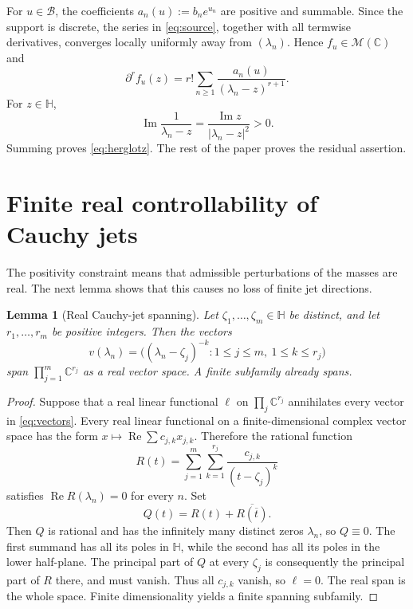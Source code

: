 \documentclass[11pt]{article}
\newtheorem{lemma}[theorem]{Lemma}
\newcommand{\C}{\mathbb C}
\newcommand{\HH}{\mathbb H}
\newcommand{\cB}{\mathcal B}
\newcommand{\cM}{\mathcal M}
\newcommand{\im}{\operatorname{Im}}
\newcommand{\D}{\partial}
\begin{document}
For $u\in\cB$, the coefficients $a_n(u):=b_ne^{u_n}$ are positive and summable.  Since the
support is discrete, the series in \eqref{eq:source}, together with all termwise derivatives,
converges locally uniformly away from $(\lambda_n)$.  Hence $f_u\in\cM(\C)$ and
\begin{equation}\label{eq:jets}
  \D^rf_u(z)=r!\sum_{n\geq1}\frac{a_n(u)}{(\lambda_n-z)^{r+1}}.
\end{equation}
For $z\in\HH$,
\[
  \im\frac1{\lambda_n-z}=
  \frac{\im z}{|\lambda_n-z|^2}>0.
\]
Summing proves \eqref{eq:herglotz}.  The rest of the paper proves the residual assertion.

\section{Finite real controllability of Cauchy jets}

The positivity constraint means that admissible perturbations of the masses are real.  The next
lemma shows that this causes no loss of finite jet directions.

\begin{lemma}[Real Cauchy-jet spanning]\label{lem:spanning}
Let $\zeta_1,\ldots,\zeta_m\in\HH$ be distinct, and let $r_1,\ldots,r_m$ be positive integers.
Then the vectors
\begin{equation}\label{eq:vectors}
  v(\lambda_n)=
  \bigl((\lambda_n-\zeta_j)^{-k}:
  1\leq j\leq m,\ 1\leq k\leq r_j\bigr)
\end{equation}
span $\prod_{j=1}^m\C^{r_j}$ as a real vector space.  A finite subfamily already spans.
\end{lemma}

\begin{proof}
Suppose that a real linear functional $\ell$ on $\prod_j\C^{r_j}$ annihilates every vector in
\eqref{eq:vectors}.  Every real linear functional on a finite-dimensional complex vector space
has the form $x\mapsto\operatorname{Re}\sum c_{j,k}x_{j,k}$.  Therefore the rational function
\[
  R(t)=\sum_{j=1}^m\sum_{k=1}^{r_j}\frac{c_{j,k}}{(t-\zeta_j)^k}
\]
satisfies $\operatorname{Re}R(\lambda_n)=0$ for every $n$.  Set
\[
  Q(t)=R(t)+\overline{R(\overline t)}.
\]
Then $Q$ is rational and has the infinitely many distinct zeros $\lambda_n$, so $Q\equiv0$.
The first summand has all its poles in $\HH$, while the second has all its poles in the lower
half-plane.  The principal part of $Q$ at every $\zeta_j$ is consequently the principal part of
$R$ there, and must vanish.  Thus all $c_{j,k}$ vanish, so $\ell=0$.  The real span is the whole
space.  Finite dimensionality yields a finite spanning subfamily.
\end{proof}
\end{document}
